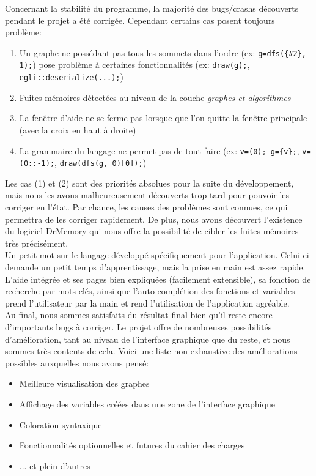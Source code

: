 \documentclass[french]{article}
\begin{document}
		Concernant la stabilité du programme, la majorité des bugs/crashs découverts pendant le projet a été corrigée. Cependant certains cas posent toujours problème:
		\begin{enumerate}
			\item Un graphe ne possédant pas tous les sommets dans l'ordre (ex: \texttt{g=dfs(\{\#2\}, 1);}) pose problème à certaines fonctionnalités (ex: \texttt{draw(g);}, \texttt{egli::deserialize(...);})
			\item Fuites mémoires détectées au niveau de la couche \textit{graphes et algorithmes}
			\item La fenêtre d'aide ne se ferme pas lorsque que l'on quitte la fenêtre principale (avec la croix en haut à droite)
			\item La grammaire du langage ne permet pas de tout faire (ex: \texttt{v=(0); g=\{v\};}, \texttt{v=(0::-1);}, \texttt{draw(dfs(g, 0)[0]);})
		\end{enumerate}
		Les cas (1) et (2) sont des priorités absolues pour la suite du développement, mais nous les avons malheureusement découverts trop tard pour pouvoir les corriger en l'état. Par chance, les causes des problèmes sont connues, ce qui permettra de les corriger rapidement. De plus, nous avons découvert l'existence du logiciel DrMemory \cite{drmemory} qui nous offre la possibilité de cibler les fuites mémoires très précisément.\\
		
		Un petit mot sur le langage développé spécifiquement pour l'application. Celui-ci demande un petit temps d'apprentissage, mais la prise en main est assez rapide. L'aide intégrée et ses pages bien expliquées (facilement extensible), sa fonction de recherche par mots-clés, ainsi que l'auto-complétion des fonctions et variables prend l'utilisateur par la main et rend l'utilisation de l'application agréable.\\  
		
		Au final, nous sommes satisfaits du résultat final bien qu'il reste encore d'importants bugs à corriger. Le projet offre de nombreuses possibilités d'amélioration, tant au niveau de l'interface graphique que du reste, et nous sommes très contents de cela. Voici une liste non-exhaustive des améliorations possibles auxquelles nous avons pensé:
		\begin{itemize}
			\item Meilleure visualisation des graphes
			\item Affichage des variables créées dans une zone de l'interface graphique
			\item Coloration syntaxique
			\item Fonctionnalités optionnelles et futures du cahier des charges
			\item ... et plein d'autres
		\end{itemize}
		
\end{document}
